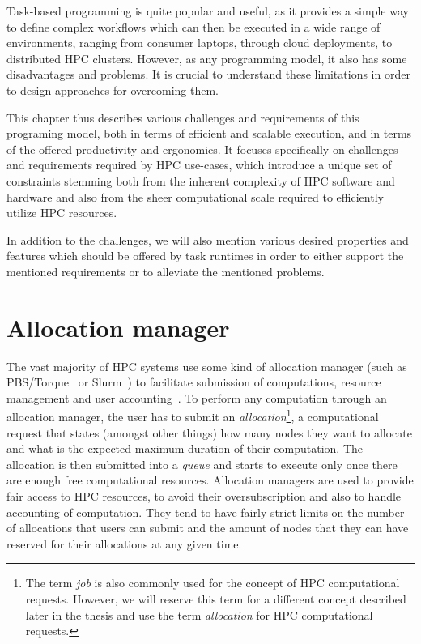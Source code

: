 Task-based programming is quite popular and useful, as it provides a simple way to define complex
workflows which can then be executed in a wide range of environments, ranging from consumer
laptops, through cloud deployments, to distributed HPC clusters. However, as any programming model,
it also has some disadvantages and problems. It is crucial to understand these limitations in order
to design approaches for overcoming them.

This chapter thus describes various challenges and requirements of this programing model, both in
terms of efficient and scalable execution, and in terms of the offered productivity and ergonomics.
It focuses specifically on challenges and requirements required by HPC use-cases, which introduce a
unique set of constraints stemming both from the inherent complexity of HPC software and hardware
and also from the sheer computational scale required to efficiently utilize HPC resources.

In addition to the challenges, we will also mention various desired properties and features which
should be offered by task runtimes in order to either support the mentioned requirements or to
alleviate the mentioned problems.

\section{Allocation manager}
The vast majority of HPC systems use some kind of allocation manager (such as
PBS\slash{}Torque~\cite{pbs} or Slurm~\cite{slurm}) to
facilitate submission of computations, resource management and user
accounting~\cite{slurm-schedmd}. To perform any computation through an allocation manager, the
user has to submit an \emph{allocation}\footnote{The term \emph{job} is also commonly used for the concept of HPC computational
requests. However, we will reserve this term for a different concept described later in the thesis and use the term
\emph{allocation} for HPC computational requests.}, a computational request
that states (amongst other things) how many nodes they want to allocate and what is the expected
maximum duration of their computation. The allocation is then submitted into a
\emph{queue} and starts to execute only once there are enough free computational
resources. Allocation managers are used to provide fair access to HPC resources, to avoid their
oversubscription and also to handle accounting of computation. They tend to have fairly strict
limits on the number of allocations that users can submit and the amount of nodes that they can
have reserved for their allocations at any given time.

